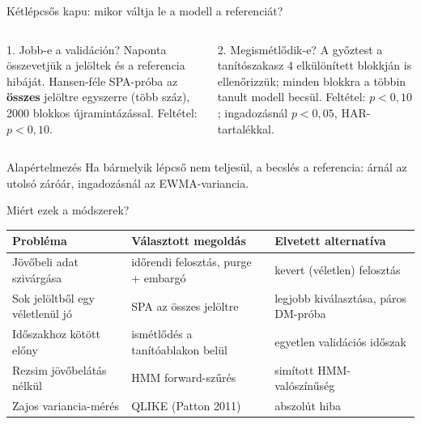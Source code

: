 \documentclass[aspectratio=169,11pt]{beamer}
\begin{document}
\begin{frame}{Kétlépcsős kapu: mikor váltja le a modell a referenciát?}
  \begin{columns}[T,onlytextwidth]
    \begin{column}{.48\textwidth}
      \begin{block}{1. Jobb-e a validáción?}
        \small
        Naponta összevetjük a jelöltek és a referencia hibáját.
        Hansen-féle SPA-próba az \textbf{összes} jelöltre egyszerre
        (több száz), 2000 blokkos újramintázással. Feltétel: $p<0{,}10$.
      \end{block}
    \end{column}
    \begin{column}{.48\textwidth}
      \begin{block}{2. Megismétlődik-e?}
        \small
        A győztest a tanítószakasz 4 elkülönített blokkján is ellenőrizzük;
        minden blokkra a többin tanult modell becsül. Feltétel: $p<0{,}10$;
        ingadozásnál $p<0{,}05$, HAR-tartalékkal.
      \end{block}
    \end{column}
  \end{columns}
  \medskip
  \begin{block}{Alapértelmezés}
    Ha bármelyik lépcső nem teljesül, a becslés a referencia:
    árnál az utolsó záróár, ingadozásnál az EWMA-variancia.
  \end{block}
\end{frame}

\begin{frame}{Miért ezek a módszerek?}
  \centering\small
  \renewcommand{\arraystretch}{1.25}
  \begin{tabular}{@{}L{.28\linewidth}L{.33\linewidth}L{.33\linewidth}@{}}
    \toprule
    \textbf{Probléma} & \textbf{Választott megoldás} & \textbf{Elvetett alternatíva}\\
    \midrule
    Jövőbeli adat szivárgása & időrendi felosztás, purge + embargó & kevert (véletlen) felosztás\\
    Sok jelöltből egy véletlenül jó & SPA az összes jelöltre & legjobb kiválasztása, páros DM-próba\\
    Időszakhoz kötött előny & ismétlődés a tanítóablakon belül & egyetlen validációs időszak\\
    Rezsim jövőbelátás nélkül & HMM forward-szűrés & simított HMM-valószínűség\\
    Zajos variancia-mérés & QLIKE (Patton 2011) & abszolút hiba\\
    \bottomrule
  \end{tabular}
\end{frame}
\end{document}
